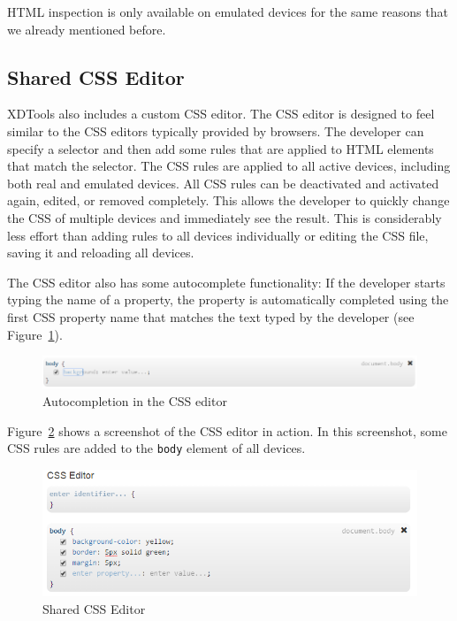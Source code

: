 HTML inspection is only available on emulated devices for the same reasons that we already mentioned before.

\subsection{Shared CSS Editor}

XDTools also includes a custom CSS editor. The CSS editor is designed to feel similar to the CSS editors typically provided by browsers. The developer can specify a selector and then add some rules that are applied to HTML elements that match the selector. The CSS rules are applied to all active devices, including both real and emulated devices. All CSS rules can be deactivated and activated again, edited, or removed completely. This allows the developer to quickly change the CSS of multiple devices and immediately see the result. This is considerably less effort than adding rules to all devices individually or editing the CSS file, saving it and reloading all devices.

The CSS editor also has some autocomplete functionality: If the developer starts typing the name of a property, the property is automatically completed using the first CSS property name that matches the text typed by the developer (see Figure~\ref{fig:css_autocomplete}).

\begin{figure}[H]
  \centering
    \includegraphics[width=1.0\textwidth]{images/screenshots/css_autocomplete.png}
	\caption[Screenshot: CSS editor autocompletion]{Autocompletion in the CSS editor}
	\label{fig:css_autocomplete}
\end{figure}

Figure~\ref{fig:css_editor} shows a screenshot of the CSS editor in action. In this screenshot, some CSS rules are added to the \lstinline|body| element of all devices.

\begin{figure}[H]
  \centering
    \includegraphics[width=1.0\textwidth]{images/screenshots/css_editor.png}
	\caption[Screenshot: CSS editor]{Shared CSS Editor}
	\label{fig:css_editor}
\end{figure}

